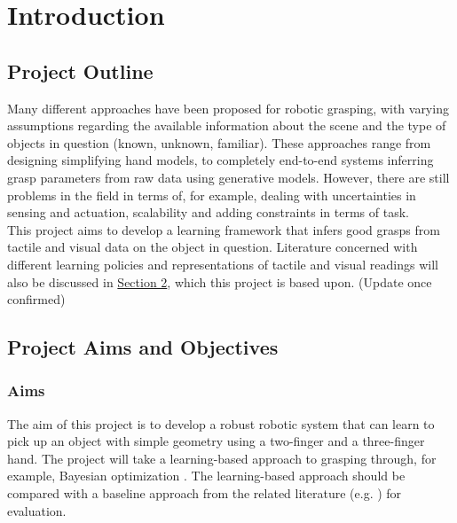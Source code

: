 \documentclass[a4paper]{report}
\theoremstyle{definition}
\begin{document}
\chapter{Introduction}
\label{chap:1}
\section{Project Outline}
\label{sec:1.1}
Many different approaches have been proposed for robotic grasping, with varying assumptions regarding the available information about the scene and the type of objects in question (known, unknown, familiar). These approaches range from designing simplifying hand models, to completely end-to-end systems inferring grasp parameters from raw data using generative models. However, there are still problems in the field in terms of, for example, dealing with uncertainties in sensing and actuation, scalability and adding constraints in terms of task.\\

{\color{red}This project aims to develop a learning framework that infers good grasps from tactile and visual data on the object in question. Literature concerned with different learning policies and representations of tactile and visual readings will also be discussed in \hyperref[sec:2]{Section 2}, which this project is based upon. (Update once confirmed)}


\section{Project Aims and Objectives}
\label{sec:1.2}
\subsection{Aims}
\label{sec:1.2.1}
The aim of this project is to develop a robust robotic system that can learn to pick up an object with simple geometry using a two-finger and a three-finger hand. The project will take a learning-based approach to grasping through, for example, Bayesian optimization \cite{nogueria, frazier}. The learning-based approach should be compared with a baseline approach from the related literature (e.g. \cite{nogueria, danielczuk, breyer}) for evaluation. 
\end{document}
